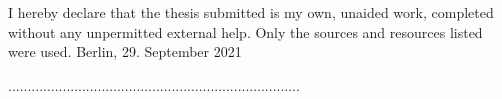 
\begin{independence}
I hereby declare that the thesis submitted is my own, unaided work, completed without any
unpermitted external help. Only the sources and resources listed were used. \newline
Berlin, 29. September 2021 \newline \hspace{2cm}

...........................................................................


    
\end{independence}